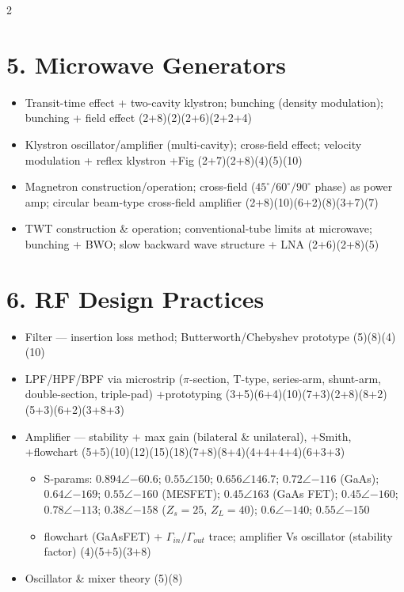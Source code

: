 \documentclass[10pt]{article}
\begin{document}
\begin{multicols}{2}
\section*{5. Microwave Generators}
\begin{itemize}
  \item Transit-time effect + two-cavity klystron; bunching (density modulation); bunching + field effect \hfill (2+8)(2)(2+6)(2+2+4)
  \item Klystron oscillator/amplifier (multi-cavity); cross-field effect; velocity modulation + reflex klystron +Fig \hfill (2+7)(2+8)(4)(5)(10)
  \item Magnetron construction/operation; cross-field ($45^\circ/60^\circ/90^\circ$ phase) as power amp; circular beam-type cross-field amplifier \hfill (2+8)(10)(6+2)(8)(3+7)(7)
  \item TWT construction \& operation; conventional-tube limits at microwave; bunching + BWO; slow backward wave structure + LNA \hfill (2+6)(2+8)(5)
\end{itemize}

\section*{6. RF Design Practices}
\begin{itemize}
  \item Filter --- insertion loss method; Butterworth/Chebyshev prototype \hfill (5)(8)(4)(10)
  \item LPF/HPF/BPF via microstrip ($\pi$-section, T-type, series-arm, shunt-arm, double-section, triple-pad) +prototyping \hfill (3+5)(6+4)(10)(7+3)(2+8)(8+2)(5+3)(6+2)(3+8+3)
  \item Amplifier --- stability + max gain (bilateral \& unilateral), +Smith, +flowchart \hfill (5+5)(10)(12)(15)(18)(7+8)(8+4)(4+4+4+4)(6+3+3)
    \begin{itemize}
      \item S-params: $0.894\angle{-60.6}$; $0.55\angle150$; $0.656\angle146.7$; $0.72\angle{-116}$ (GaAs); $0.64\angle{-169}$; $0.55\angle{-160}$ (MESFET); $0.45\angle163$ (GaAs FET); $0.45\angle{-160}$; $0.78\angle{-113}$; $0.38\angle{-158}$ ($Z_s{=}25$, $Z_L{=}40$); $0.6\angle{-140}$; $0.55\angle{-150}$
      \item flowchart (GaAsFET) + $\Gamma_{in}/\Gamma_{out}$ trace; amplifier Vs oscillator (stability factor) \hfill (4)(5+5)(3+8)
    \end{itemize}
  \item Oscillator \& mixer theory \hfill (5)(8)
\end{itemize}


\end{multicols}
\end{document}
